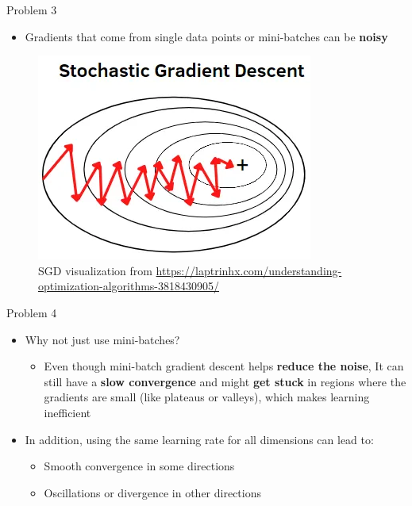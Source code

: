 \documentclass[serif, aspectratio=169]{beamer}
\begin{document}
\begin{frame}{Problem 3}
    \begin{minipage}{0.4\textwidth}
        \begin{itemize}
        \item Gradients that come from single data points or mini-batches can be \textbf{noisy}
        \end{itemize}
    \end{minipage}%
    \begin{minipage}{0.6\textwidth}
        \centering
        \begin{figure}
            \centering
            \includegraphics[width=0.6\linewidth]{pic/sgd_mlexplained.png}
            \caption{\footnotesize SGD visualization from \url{https://laptrinhx.com/understanding-optimization-algorithms-3818430905/}}
        \end{figure}
    \end{minipage}
\end{frame}

\begin{frame}{Problem 4}
    \begin{itemize}
        \item Why not just use mini-batches?
        \begin{itemize}
            \item Even though mini-batch gradient descent helps \textbf{reduce the noise}, It can still have a \textbf{slow convergence} and might \textbf{get stuck} in regions where the gradients are small (like plateaus or valleys), which makes learning inefficient
        \end{itemize}
        \item In addition, using the same learning rate for all dimensions can lead to:
        \begin{itemize}
            \item Smooth convergence in some directions
            \item Oscillations or divergence in other directions
        \end{itemize}
    \end{itemize}
\end{frame}
\end{document}
